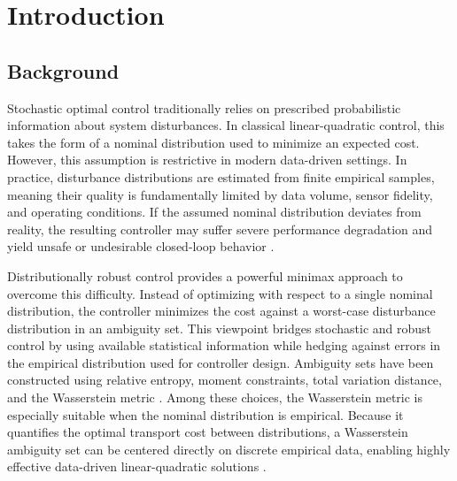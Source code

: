\documentclass[10pt,journal,twoside]{IEEEtran}
\theoremstyle{definition}
\theoremstyle{remark}
\begin{document}
\section{Introduction}

\subsection{Background}

Stochastic optimal control traditionally relies on prescribed probabilistic information about system disturbances. In classical linear-quadratic control, this takes the form of a nominal distribution used to minimize an expected cost. However, this assumption is restrictive in modern data-driven settings. In practice, disturbance distributions are estimated from finite empirical samples, meaning their quality is fundamentally limited by data volume, sensor fidelity, and operating conditions. If the assumed nominal distribution deviates from reality, the resulting controller may suffer severe performance degradation and yield unsafe or undesirable closed-loop behavior
\cite{Yang2021TAC,HakobyanYang2024}.

Distributionally robust control provides a powerful minimax approach to overcome this difficulty.
Instead of optimizing with respect to a single nominal distribution, the
controller minimizes the cost against a worst-case disturbance distribution in an
ambiguity set.  This viewpoint bridges stochastic and robust control by using
available statistical information while hedging against errors in the empirical distribution used for controller design.  Ambiguity sets have been constructed using relative entropy, moment constraints, total variation distance, and the Wasserstein metric
\cite{PetersenJamesDupuis2000,UgrinovskiiPetersen2002,
DelageYe2010,WiesemannKuhnSim2014,VanParysKuhnGoulartMorari2016,
CoulsonLygerosDorfler2022,Yang2021TAC}.  Among
these choices, the Wasserstein metric is especially suitable when the nominal
distribution is empirical.  
Because it quantifies the optimal transport cost between distributions, a Wasserstein ambiguity set can be centered directly on discrete empirical data, enabling highly effective data-driven linear-quadratic solutions
\cite{MohajerinEsfahaniKuhn2018,GaoKleywegt2023,KuhnShafieeWiesemann2025,
Yang2021TAC,KimYang2023,HakobyanYang2024}.
\end{document}

